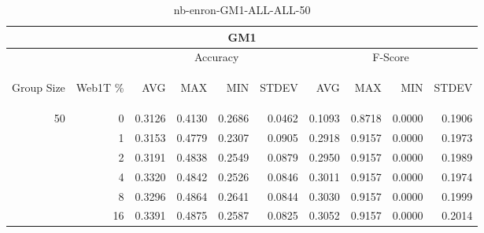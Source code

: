 \begin{center}
\begin{table}[htbp] 
 \begin{center}
\begin{tabular}{ | r | r | r | r | r | r | r | r | r | r |}
\hline
\multicolumn{10}{|c|}{GM1}\\
\hline
 & & \multicolumn{4}{|c|}{Accuracy} & \multicolumn{4}{|c|}{F-Score}\\ \cline{3-10}
\begin{sideways}Group Size\end{sideways} & \begin{sideways}Web1T \%\end{sideways} & \begin{sideways}AVG\end{sideways} & \begin{sideways}MAX\end{sideways} & \begin{sideways}MIN\end{sideways} & \begin{sideways}STDEV\end{sideways} & \begin{sideways}AVG\end{sideways} & \begin{sideways}MAX\end{sideways} & \begin{sideways}MIN\end{sideways} & \begin{sideways}STDEV\end{sideways}\\
\hline
\multirow{5}{*}{50}
 & 0 & 0.3126 & 0.4130 & 0.2686 & 0.0462 & 0.1093 & 0.8718 & 0.0000 & 0.1906\\ \cline{2-10}
 & 1 & 0.3153 & 0.4779 & 0.2307 & 0.0905 & 0.2918 & 0.9157 & 0.0000 & 0.1973\\ \cline{2-10}
 & 2 & 0.3191 & 0.4838 & 0.2549 & 0.0879 & 0.2950 & 0.9157 & 0.0000 & 0.1989\\ \cline{2-10}
 & 4 & 0.3320 & 0.4842 & 0.2526 & 0.0846 & 0.3011 & 0.9157 & 0.0000 & 0.1974\\ \cline{2-10}
 & 8 & 0.3296 & 0.4864 & 0.2641 & 0.0844 & 0.3030 & 0.9157 & 0.0000 & 0.1999\\ \cline{2-10}
 & 16 & 0.3391 & 0.4875 & 0.2587 & 0.0825 & 0.3052 & 0.9157 & 0.0000 & 0.2014\\ \cline{2-10}
\hline
\end{tabular}
\caption{nb-enron-GM1-ALL-ALL-50}
\label{table:nb-enron-GM1-ALL-ALL-50}
\end{center}
 \end{table}
\end{center}

